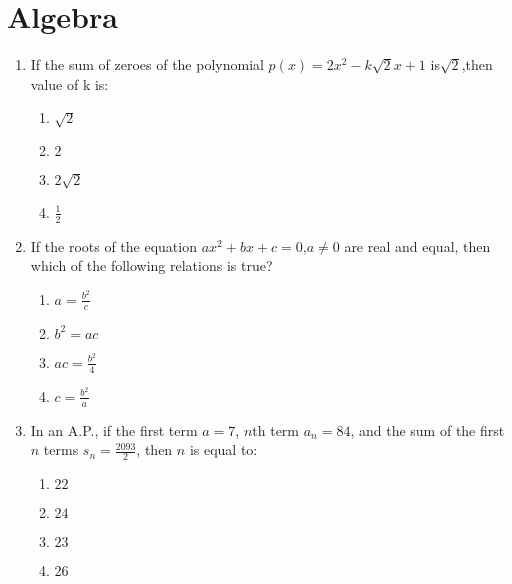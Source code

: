 \documentclass[12pt,-letter paper]{article}
\providecommand{\brak}[1]{\ensuremath{\left(#1\right)}}
\providecommand{\brak}[1]{\ensuremath{\left(#1\right)}}
\begin{document}
\centering
\section*{Algebra}	
\begin{enumerate}


\item If the sum of zeroes of the polynomial $ p\brak x = 2x^2 - k\sqrt2x+1 $ is${\sqrt2} $,then value of k is:
\begin{enumerate}
    \item $ \sqrt{2} $
    \item $2$
    \item $ 2  \sqrt{2} $
    \item $ \frac{1}{2} $
 \end{enumerate}

\item If the roots of the equation $ax^2 + bx + c = 0$,$a \neq 0$ are real and equal, then which of the following relations is true?
\begin{enumerate}    
    \item $a = \frac{b^2}{c}$
    \item $b^2 = ac$                                                                                    \item $ac = \frac{b^2}{4}$
    \item $c = \frac{b^2}{a}$
\end{enumerate}

\item In an A.P., if the first term $a = 7$, $n$th term $a_{n} = 84$, and the sum of the first $n$ terms $s_{n} = \frac{2093}{2}$, then $n$ is equal to:
\begin{enumerate}
    \item $22$
    \item $24$
    \item $23$
    \item $26$
\end{enumerate}


\end{enumerate}
\end{document}
